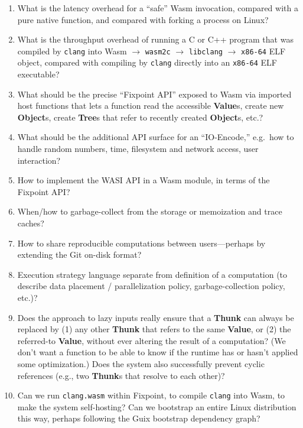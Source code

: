 \documentclass{article}
\newcommand{\valuex}{\textbf{Value}\xspace}
\newcommand{\valuexs}{\textbf{Value}s\xspace}
\newcommand{\objects}{\textbf{Object}s\xspace}
\newcommand{\thunk}{\textbf{Thunk}\xspace}
\newcommand{\thunks}{\textbf{Thunk}s\xspace}
\newcommand{\trees}{\textbf{Tree}s\xspace}
\begin{document}
\begin{enumerate}[itemsep=0pt]
\item What is the latency overhead for a ``safe'' Wasm invocation, compared with a pure native function,
  and compared with forking a process on Linux?

\item What is the throughput overhead of running a C or C++ program
  that was compiled by \texttt{clang} into Wasm $\rightarrow$
  \texttt{wasm2c} $\rightarrow$ \texttt{libclang} $\rightarrow$
  \texttt{x86-64} ELF object, compared with compiling by \texttt{clang}
  directly into an \texttt{x86-64} ELF executable?

\item What should be the precise ``Fixpoint API'' exposed to Wasm via imported host functions that lets a function read the accessible \valuexs, create new \objects,
  create \trees that refer to recently created \objects, etc.?
  
\item What should be the additional API surface for an ``IO-Encode,'' e.g.~how to handle random numbers, time, filesystem and network access, user interaction?

\item How to implement the WASI API in a Wasm module, in terms of the Fixpoint API?
  
\item When/how to garbage-collect from the storage or memoization and trace caches?

\item How to share reproducible computations between users---perhaps by extending the Git on-disk format?
  
\item Execution strategy language separate from definition of a
  computation (to describe data placement / parallelization policy,
  garbage-collection policy, etc.)?
  
\item Does the approach to lazy inputs really ensure that a \thunk can
  always be replaced by (1) any other \thunk that refers to the same
  \valuex, or (2) the referred-to \valuex, without ever altering the
  result of a computation? (We don't want a function to be able to
  know if the runtime has or hasn't applied some optimization.) Does
  the system also successfully prevent cyclic references (e.g., two \thunks that resolve to
  each other)?

\item Can we run \texttt{clang.wasm} within Fixpoint, to compile
  \texttt{clang} into Wasm, to make the system self-hosting? Can we bootstrap an entire Linux distribution
  this way, perhaps following the Guix bootstrap dependency graph?


\end{enumerate}
\end{document}
